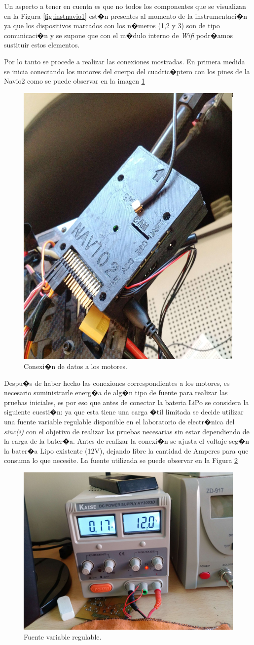 		Un aspecto a tener en cuenta es que no todos los componentes que se visualizan en la Figura \ref{fig:instnavio1} est�n presentes al momento de la instrumentaci�n ya que los dispositivos marcados con los n�meros (1,2 y 3) son de tipo comunicaci�n y se supone que con el m�dulo interno de \textit{Wifi} podr�amos sustituir estos elementos. 
		\par Por lo tanto se procede a realizar las conexiones mostradas. En primera medida se inicia conectando los motores del cuerpo del cuadric�ptero con los pines de la Navio2 como se puede observar en la imagen \ref{fig:conexionmotores}
		
		\begin{figure}[h!]
			\centering
			\includegraphics[width=0.4\linewidth, height=0.3\textheight]{Imagenes/fotos/conexion_motores}
			\caption{Conexi�n de datos a los motores.}
			\label{fig:conexionmotores}
		\end{figure}
		
		Despu�s de haber hecho las conexiones correspondientes a los motores, es necesario suministrarle energ�a de alg�n tipo de fuente para realizar las pruebas iniciales, es por eso que antes de conectar la bateria LiPo se considera la siguiente cuesti�n: ya que esta tiene una carga �til limitada se decide utilizar una fuente variable regulable disponible en el laboratorio de electr�nica del \textit{sinc(i)}  con el objetivo de realizar las pruebas necesarias sin estar dependiendo de la carga de la bater�a. Antes de realizar la conexi�n se ajusta el voltaje seg�n la bater�a Lipo existente (12V), dejando libre la cantidad de Amperes para que consuma lo que necesite. La fuente utilizada se puede observar en la Figura  \ref{fig:fuentevr}
		
		\begin{figure}[h!]
		\centering
		\includegraphics[width=0.4\linewidth, height=0.3\textheight]{Imagenes/fotos/fuentevr}
		\caption{Fuente variable regulable.}
		\label{fig:fuentevr}
		\end{figure}
		
